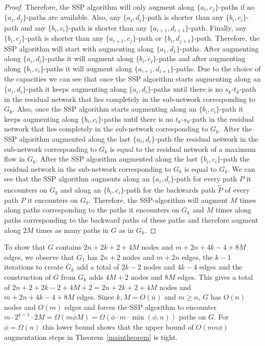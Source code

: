 \documentclass[11pt]{article}
\begin{document}
\begin{proof}
Therefore, the SSP algorithm will
only augment along $\{a_i,c_j\}$-paths if no $\{a_i,d_j\}$-paths are available.
Also, any $\{a_i,d_i\}$-path is shorter than any $\{b_i,c_i\}$-path and any $\{b_i,c_i\}$-path is shorter than any
$\{a_{i+1},d_{i+1}\}$-path. Finally, any $\{b_i,c_j\}$-path is shorter than any $\{a_{i+1},c_j\}$-path or $\{b_i,d_{j+1}\}$-path.
Therefore, the SSP algorithm will start with augmenting along $\{a_1,d_1\}$-paths. After augmenting along $\{a_i,d_i\}$-paths it will augment
along $\{b_i,c_i\}$-paths and after augmenting along $\{b_i,c_i\}$-paths it will augment along $\{a_{i+1},d_{i+1}\}$-paths.
Due to the choice of the capacities we can see that once the SSP algorithm starts augmenting along an $\{a_i,d_i\}$-path it keeps augmenting
along $\{a_i,d_i\}$-paths until there is no $s_k$-$t_k$-path in the residual network that lies completely in the sub-network corresponding
to $G_k$. Also, once the SSP algorithm starts augmenting along an $\{b_i,c_i\}$-path it keeps augmenting along $\{b_i,c_i\}$-paths until
there is no $t_k$-$s_k$-path in the residual network that lies completely in the sub-network corresponding  to $G_k$.
After the SSP algorithm augmented along the last $\{a_i,d_i\}$-path the residual network in the sub-network corresponding to $G_k$ is equal
to the residual network of a maximum flow in $G_k$. After the SSP algorithm augmented along the last $\{b_i,c_i\}$-path the residual network
in the sub-network corresponding to $G_k$ is equal to $G_k$. We can see that the SSP algorithm augments along an $\{a_i,d_i\}$-path for every path $P$ it encounters on $G_k$ and along an
$\{b_i,c_i\}$-path for the backwards path $\stackrel{\leftarrow}{P}$ of every path $P$ it encounters on $G_k$.
Therefore, the SSP-algorithm will augment $M$ times along paths corresponding to the paths it encounters on $G_k$ and $M$ times along
paths corresponding to the backward paths of these paths and therefore augment along $2M$ times as many paths in
$G$ as in $G_k$.
\end{proof}

To show that $G$ contains $2n+2k+2+4M$ nodes and $m+2n+4k-4+8M$ edges, we
observe that $G_1$ has $2n+2$ nodes and $m+2n$ edges, the $k-1$ iterations to
create $G_k$ add a total of $2k-2$ nodes and $4k-4$ edges and the construction
of $G$ from $G_k$ adds $4M+2$ nodes and $8M$ edges. This gives a total of
$2n+2+2k-2+4M+2 = 2n+2k+2+4M$ nodes and $m+2n+4k-4+8M$ edges. Since $k, M =
O(n)$ and $m\geq n$, $G$ has $O(n)$ nodes and $O(m)$ edges and forces the SSP
algorithm to encounter $m \cdot 2^{k-1} \cdot 2M = \Omega(m \phi M)=\Omega(\phi
\cdot m \cdot \min(\phi, n))$ paths on $G$. For $\phi = \Omega(n)$ this lower
bound shows that the upper bound of $O(mn\phi)$ augmentation steps in
Theorem~\ref{maintheorem} is tight.
\end{document}
